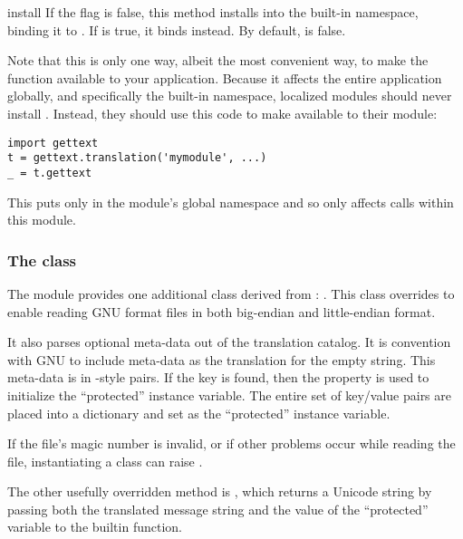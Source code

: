 \begin{methoddesc}[NullTranslations]{install}{}
If the  flag is false, this method installs
 into the built-in namespace, binding it to
\samp{_}.  If  is true, it binds 
instead.  By default,  is false.

Note that this is only one way, albeit the most convenient way, to
make the \function{_} function available to your application.  Because it
affects the entire application globally, and specifically the built-in
namespace, localized modules should never install \function{_}.
Instead, they should use this code to make \function{_} available to
their module:

\begin{verbatim}
import gettext
t = gettext.translation('mymodule', ...)
_ = t.gettext
\end{verbatim}

This puts \function{_} only in the module's global namespace and so
only affects calls within this module.
\end{methoddesc}

\subsubsection{The  class}

The  module provides one additional class derived from
: .  This class
overrides  to enable reading GNU 
format  files in both big-endian and little-endian format.

It also parses optional meta-data out of the translation catalog.  It
is convention with GNU  to include meta-data as the
translation for the empty string.  This meta-data is in -style
 pairs.  If the key  is found,
then the  property is used to initialize the
``protected''  instance variable.  The entire set of
key/value pairs are placed into a dictionary and set as the
``protected''  instance variable.

If the  file's magic number is invalid, or if other problems
occur while reading the file, instantiating a  class
can raise .

The other usefully overridden method is , which
returns a Unicode string by passing both the translated message string
and the value of the ``protected''  variable to the
builtin  function.

